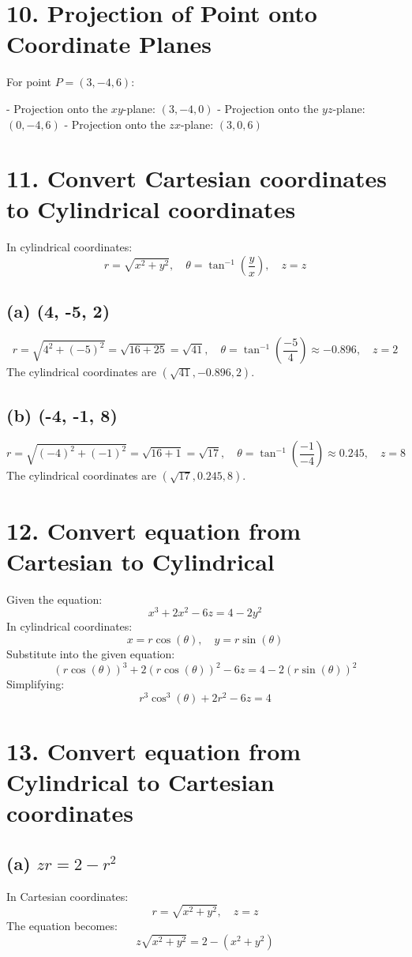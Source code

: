 \documentclass[11pt]{article}
\begin{document}
\section*{10. Projection of Point onto Coordinate Planes}

For point $P = (3, -4, 6)$:

- Projection onto the $xy$-plane: $(3, -4, 0)$
- Projection onto the $yz$-plane: $(0, -4, 6)$
- Projection onto the $zx$-plane: $(3, 0, 6)$


\section*{11. Convert Cartesian coordinates to Cylindrical coordinates}
In cylindrical coordinates:
\[
r = \sqrt{x^2 + y^2}, \quad \theta = \tan^{-1}\left(\frac{y}{x}\right), \quad z = z
\]
\subsection*{(a) (4, -5, 2)}
\[
r = \sqrt{4^2 + (-5)^2} = \sqrt{16 + 25} = \sqrt{41}, \quad \theta = \tan^{-1}\left(\frac{-5}{4}\right) \approx -0.896, \quad z = 2
\]
The cylindrical coordinates are \((\sqrt{41}, -0.896, 2)\).

\subsection*{(b) (-4, -1, 8)}
\[
r = \sqrt{(-4)^2 + (-1)^2} = \sqrt{16 + 1} = \sqrt{17}, \quad \theta = \tan^{-1}\left(\frac{-1}{-4}\right) \approx 0.245, \quad z = 8
\]
The cylindrical coordinates are \((\sqrt{17}, 0.245, 8)\).

\section*{12. Convert equation from Cartesian to Cylindrical}
Given the equation:
\[
x^3 + 2x^2 - 6z = 4 - 2y^2
\]
In cylindrical coordinates:
\[
x = r \cos(\theta), \quad y = r \sin(\theta)
\]
Substitute into the given equation:
\[
(r \cos(\theta))^3 + 2(r \cos(\theta))^2 - 6z = 4 - 2(r \sin(\theta))^2
\]
Simplifying:
\[
r^3 \cos^3(\theta) + 2r^2  - 6z = 4 
\]

\section*{13. Convert equation from Cylindrical to Cartesian coordinates}
\subsection*{(a) \( zr = 2 - r^2 \)}
In Cartesian coordinates:
\[
r = \sqrt{x^2 + y^2}, \quad z = z
\]
The equation becomes:
\[
z\sqrt{x^2 + y^2} = 2 - (x^2 + y^2)
\]
\end{document}

